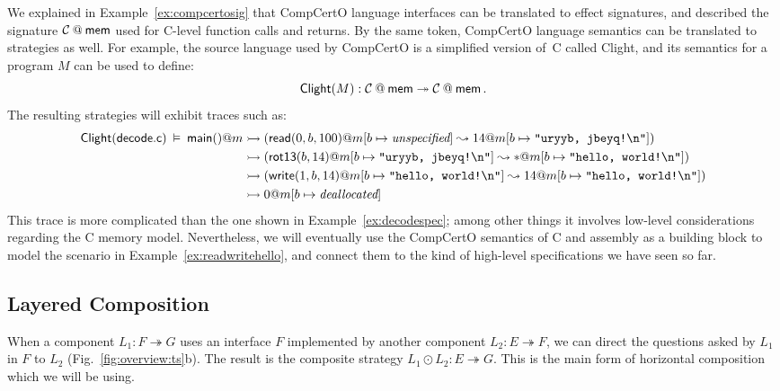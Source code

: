 \begin{example} \label{ex:compcertosem} %
We explained in Example~\ref{ex:compcertosig} that
CompCertO language interfaces can be translated to effect signatures,
and described the signature $\mathcal{C} \mathbin@ \kw{mem}$
used for C-level function calls and returns.
By the same token, CompCertO language semantics
can be translated to strategies as well.
For example,
the source language used by CompCertO
is a simplified version of~C called Clight,
and its semantics for a program $M$ can be used to define:
\[
  \kw{Clight}(M) : \mathcal{C} \mathbin@ \kw{mem}
    \twoheadrightarrow \mathcal{C} \mathbin@ \kw{mem}
  \,.
\]
The resulting strategies will exhibit traces such as:
{\scriptsize
\begin{align*}
   \mathsf{Clight} ( \mathsf{decode.c} ) \:\vDash\:
   \mathsf{main} ()@m &\rightarrowtail
  ( \mathsf{read} (0, b, 100)@m[b \mapsto \textit{unspecified}] \leadsto
   14@m[b \mapsto \texttt{"uryyb, jbeyq!\textbackslash{}n"}]) \\& \rightarrowtail
  ( \mathsf{rot13} (b, 14)@m[b \mapsto \texttt{"uryyb, jbeyq!\textbackslash{}n"}] \leadsto
   {*}@m[b \mapsto \texttt{"hello, world!\textbackslash{}n"}]) \\& \rightarrowtail
  ( \mathsf{write} (1, b, 14)@m[b \mapsto \texttt{"hello, world!\textbackslash{}n"}] \leadsto
    14@m[b \mapsto \texttt{"hello, world!\textbackslash{}n"}]) \\& \rightarrowtail
  0@m[b \mapsto \textit{deallocated}]
\end{align*}
}%
This trace is more complicated than the one shown in Example~\ref{ex:decodespec};
among other things it involves low-level considerations regarding
the C memory model.
Nevertheless,
we will eventually use the CompCertO semantics of C and assembly
as a building block to model the scenario in Example~\ref{ex:readwritehello},
and connect them to the kind of high-level specifications we have seen so far.
\end{example}


\subsection{Layered Composition} %

When a component $L_1 : F \twoheadrightarrow G$
uses an interface $F$ implemented by
another component $L_2 : E \twoheadrightarrow F$,
we can direct the questions asked by $L_1$ in $F$ to $L_2$
(Fig.~\ref{fig:overview:ts}b).
The result is the composite strategy
$L_1 \odot L_2 : E \twoheadrightarrow G$. %
This is the main form of horizontal composition which we will be using.

